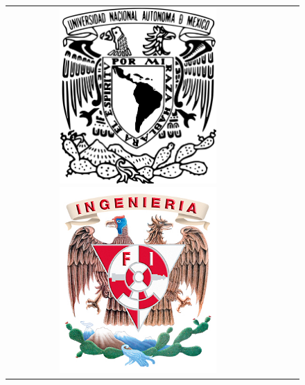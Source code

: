 \documentclass[11pt, english]{article}
\begin{document}
\begin{titlepage}

\begin{center}
\vspace*{-1in}
\begin{figure}[htb]
\begin{center}
\centering
\begin{tabular}{@{}cccc@{}}
\includegraphics[width=6cm]{images/EscudoUNAM.png}
\hspace*{1.2in}
\includegraphics[width=6cm]{images/logoIng.png}
\end{tabular}
\end{center}
\end{figure}


\end{center}
\end{titlepage}
\end{document}

